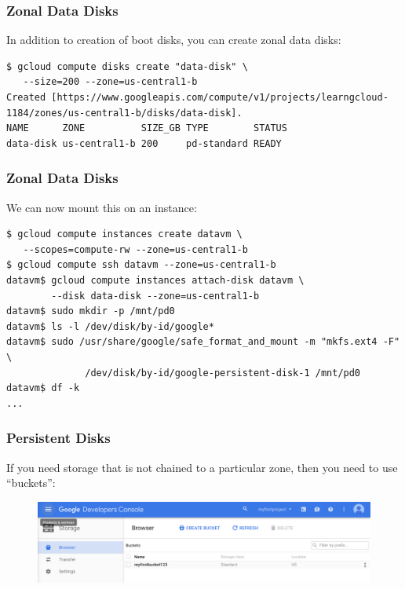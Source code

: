 \documentclass[9pt]{beamer}
\begin{document}
\begin{frame}[fragile]
\frametitle{Zonal Data Disks}
In addition to creation of boot disks, you can create zonal data disks:
\begin{verbatim}
$ gcloud compute disks create "data-disk" \
   --size=200 --zone=us-central1-b
Created [https://www.googleapis.com/compute/v1/projects/learngcloud-1184/zones/us-central1-b/disks/data-disk].
NAME      ZONE          SIZE_GB TYPE        STATUS
data-disk us-central1-b 200     pd-standard READY
\end{verbatim}
\end{frame}

\begin{frame}[fragile]
\frametitle{Zonal Data Disks}
We can now mount this on an instance:
\begin{verbatim}
$ gcloud compute instances create datavm \
   --scopes=compute-rw --zone=us-central1-b
$ gcloud compute ssh datavm --zone=us-central1-b
datavm$ gcloud compute instances attach-disk datavm \
        --disk data-disk --zone=us-central1-b
datavm$ sudo mkdir -p /mnt/pd0
datavm$ ls -l /dev/disk/by-id/google*	
datavm$ sudo /usr/share/google/safe_format_and_mount -m "mkfs.ext4 -F" \
              /dev/disk/by-id/google-persistent-disk-1 /mnt/pd0
datavm$ df -k
...
\end{verbatim}
\end{frame}



\begin{frame}[fragile]
  \frametitle{Persistent Disks}
  If you need storage that is not chained to a particular zone, then you need to use ``buckets'':
  \begin{figure}
    \includegraphics[scale=0.2]{figures/Buckets.png}
  \end{figure}
\end{frame}
\end{document}
